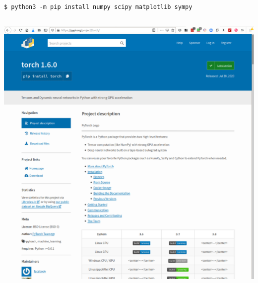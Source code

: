 \begin{frame}[fragile]
  \begin{example}[Installation]
    \begin{verbatim}
$ python3 -m pip install numpy scipy matplotlib sympy
    \end{verbatim}
  \end{example}

  \begin{example}
    \inputminted[lastline=9]{python}{examples/symalg.py}
  \end{example}
\end{frame}

\begin{frame}
  \includegraphics[width=\columnwidth]{figs/pypi-torch.png}
\end{frame}

